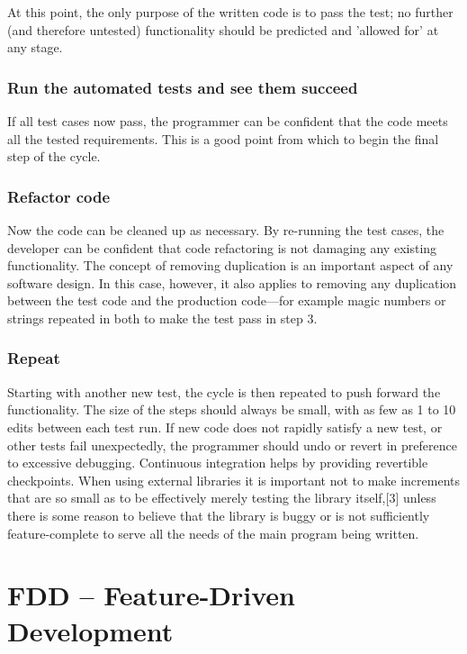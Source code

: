 At this point, the only purpose of the written code is to pass the test; no further (and therefore untested) functionality should be predicted and 'allowed for' at any stage.

\subsubsection{Run the automated tests and see them succeed}

If all test cases now pass, the programmer can be confident that the code meets all the tested requirements. This is a good point from which to begin the final step of the cycle.

\subsubsection{Refactor code}

Now the code can be cleaned up as necessary. By re-running the test cases, the developer can be confident that code refactoring is not damaging any existing functionality. The concept of removing duplication is an important aspect of any software design. In this case, however, it also applies to removing any duplication between the test code and the production code—for example magic numbers or strings repeated in both to make the test pass in step 3.

\subsubsection{Repeat}

Starting with another new test, the cycle is then repeated to push forward the functionality. The size of the steps should always be small, with as few as 1 to 10 edits between each test run. If new code does not rapidly satisfy a new test, or other tests fail unexpectedly, the programmer should undo or revert in preference to excessive debugging. Continuous integration helps by providing revertible checkpoints. When using external libraries it is important not to make increments that are so small as to be effectively merely testing the library itself,[3] unless there is some reason to believe that the library is buggy or is not sufficiently feature-complete to serve all the needs of the main program being written.



\section{FDD -- Feature-Driven Development}

